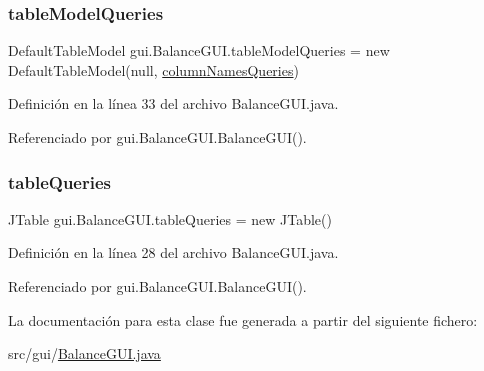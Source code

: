 \mbox{\label{classgui_1_1BalanceGUI_a8d9ff8acd0452117f992f344e5da8ee7}} 
\subsubsection{\texorpdfstring{tableModelQueries}{tableModelQueries}}
{\footnotesize\ttfamily Default\+Table\+Model gui.\+Balance\+G\+U\+I.\+table\+Model\+Queries = new Default\+Table\+Model(null, \mbox{\hyperlink{classgui_1_1BalanceGUI_ab4164b2af93e9d39e36115108b207159}{column\+Names\+Queries}})\hspace{0.3cm}{\ttfamily [private]}}



Definición en la línea 33 del archivo Balance\+G\+U\+I.\+java.



Referenciado por gui.\+Balance\+G\+U\+I.\+Balance\+G\+U\+I().

\mbox{\label{classgui_1_1BalanceGUI_a5db44888868172a54138bd769a6df424}} 
\subsubsection{\texorpdfstring{tableQueries}{tableQueries}}
{\footnotesize\ttfamily J\+Table gui.\+Balance\+G\+U\+I.\+table\+Queries = new J\+Table()\hspace{0.3cm}{\ttfamily [private]}}



Definición en la línea 28 del archivo Balance\+G\+U\+I.\+java.



Referenciado por gui.\+Balance\+G\+U\+I.\+Balance\+G\+U\+I().



La documentación para esta clase fue generada a partir del siguiente fichero\+:\begin{DoxyCompactItemize}
\item 
src/gui/\mbox{\hyperlink{BalanceGUI_8java}{Balance\+G\+U\+I.\+java}}\end{DoxyCompactItemize}
